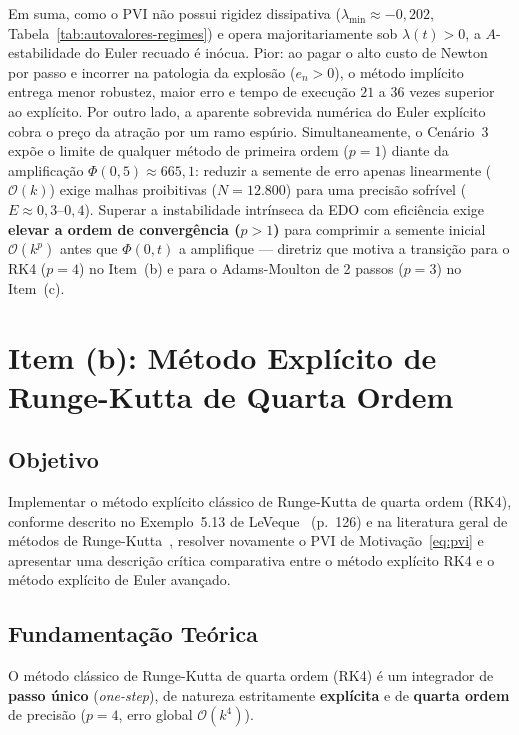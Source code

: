 \documentclass[12pt, a4paper]{article}
\begin{document}
Em suma, como o PVI não possui rigidez dissipativa ($\lambda_{\min} \approx -0{,}202$, Tabela~\ref{tab:autovalores-regimes}) e opera majoritariamente sob $\lambda(t) > 0$, a $A$-estabilidade do Euler recuado é inócua. Pior: ao pagar o alto custo de Newton por passo e incorrer na patologia da explosão ($e_n > 0$), o método implícito entrega menor robustez, maior erro e tempo de execução $21$ a $36$ vezes superior ao explícito. Por outro lado, a aparente sobrevida numérica do Euler explícito cobra o preço da atração por um ramo espúrio. Simultaneamente, o Cenário~3 expõe o limite de qualquer método de primeira ordem ($p = 1$) diante da amplificação $\Phi(0, 5) \approx 665{,}1$: reduzir a semente de erro apenas linearmente ($\mathcal{O}(k)$) exige malhas proibitivas ($N = 12.800$) para uma precisão sofrível ($E \approx 0{,}3\text{--}0{,}4$). Superar a instabilidade intrínseca da EDO com eficiência exige \textbf{elevar a ordem de convergência ($p > 1$)} para comprimir a semente inicial $\mathcal{O}(k^p)$ antes que $\Phi(0, t)$ a amplifique — diretriz que motiva a transição para o RK4 ($p = 4$) no Item~(b) e para o Adams-Moulton de 2 passos ($p = 3$) no Item~(c).

\section{Item (b): Método Explícito de Runge-Kutta de Quarta Ordem}
\label{sec:item-b}

\subsection{Objetivo}

Implementar o método explícito clássico de Runge-Kutta de quarta ordem (RK4),
conforme descrito no Exemplo~5.13 de
LeVeque~\cite{leveque2007} (p.~126) e na literatura geral de métodos de
Runge-Kutta~\cite{butcher1985}, resolver novamente o PVI de
Motivação~\eqref{eq:pvi} e apresentar uma descrição crítica comparativa entre o
método explícito RK4 e o método explícito de Euler avançado.

\subsection{Fundamentação Teórica}
\label{sec:b-teoria}
O método clássico de Runge-Kutta de quarta ordem (RK4) é um integrador de \textbf{passo único} (\emph{one-step}), de natureza estritamente \textbf{explícita} e de \textbf{quarta ordem} de precisão ($p = 4$, erro global $\mathcal{O}(k^4)$).
\end{document}
